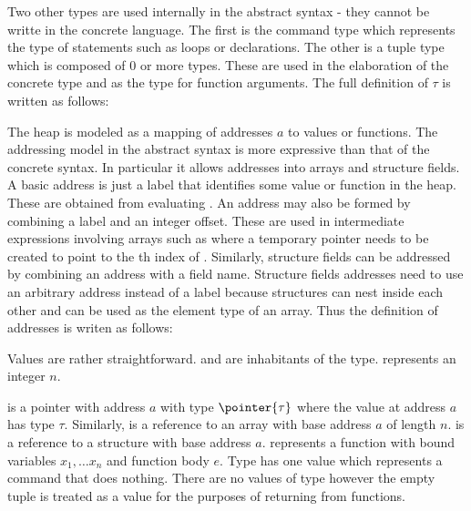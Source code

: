 \classp

Two other types are used internally in the abstract syntax - they cannot be
writte in the concrete language. The first is the command type \commandty{}
which represents the type of statements such as loops or declarations. The other
is a tuple type  which is composed of 0 or more
types. These are used in the elaboration of the concrete  type
and as the type for function arguments. The full definition of $\tau$ is written
as follows:

\classtau

The heap is modeled as a mapping of addresses $a$ to values or functions. The
addressing model in the abstract syntax is more expressive than that of the
concrete syntax. In particular it allows addresses into arrays and structure
fields. A basic address is just a label that identifies some value or function
in the heap. These are obtained from evaluating . An address may
also be formed by combining a label and an integer offset. These are used in
intermediate expressions involving arrays such as  where a
temporary pointer needs to be created to point to the th index of
. Similarly, structure fields can be addressed by combining an
address with a field name. Structure fields addresses need to use an arbitrary
address instead of a label because structures can nest inside each other and can
be used as the element type of an array. Thus the definition of addresses is
writen as follows:

\classa

Values are rather straightforward. \true{} and \false{} are inhabitants of the
\bool{} type.  represents an integer $n$. \address{a} is a pointer
with address $a$ with type $\pointer{\tau}$ where the value at address $a$ has
type $\tau$. Similarly,  is a reference to an array with base
address $a$ of length $n$.  is a reference to a structure with base
address $a$.  represents a function with bound
variables $x_1, \ldots x_n$ and function body $e$. Type \commandty{} has one
value \nop{} which represents a command that does nothing. There are no values
of type \tuple{\ldots} however the empty tuple \tuple{} is treated as a value
for the purposes of returning from functions.

\classv

